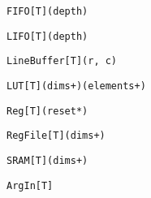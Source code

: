 \begin{table*}
\newsavebox{\fifoSyntax}
\begin{lrbox}{\fifoSyntax}
\begin{lstlisting}[language=SpatialTable]
FIFO[T](depth)
\end{lstlisting}
\end{lrbox}

\newsavebox{\filoSyntax}
\begin{lrbox}{\filoSyntax}
\begin{lstlisting}[language=SpatialTable]
LIFO[T](depth)
\end{lstlisting}
\end{lrbox}

\newsavebox{\lineBufferSyntax}
\begin{lrbox}{\lineBufferSyntax}
\begin{lstlisting}[language=SpatialTable]
LineBuffer[T](r, c)
\end{lstlisting}
\end{lrbox}

\newsavebox{\lutSyntax}
\begin{lrbox}{\lutSyntax}
\begin{lstlisting}[language=SpatialTable]
LUT[T](dims+)(elements+)
\end{lstlisting}
\end{lrbox}

\newsavebox{\regSyntax}
\begin{lrbox}{\regSyntax}
\begin{lstlisting}[language=SpatialTable]
Reg[T](reset*)
\end{lstlisting}
\end{lrbox}

\newsavebox{\regfileSyntax}
\begin{lrbox}{\regfileSyntax}
\begin{lstlisting}[language=SpatialTable]
RegFile[T](dims+)
\end{lstlisting}
\end{lrbox}

\newsavebox{\sramSyntax}
\begin{lrbox}{\sramSyntax}
\begin{lstlisting}[language=SpatialTable]
SRAM[T](dims+)
\end{lstlisting}
\end{lrbox}

\newsavebox{\argInSyntax}
\begin{lrbox}{\argInSyntax}
\begin{lstlisting}[language=SpatialTable]
ArgIn[T]
\end{lstlisting}
\end{lrbox}


\end{table*}
